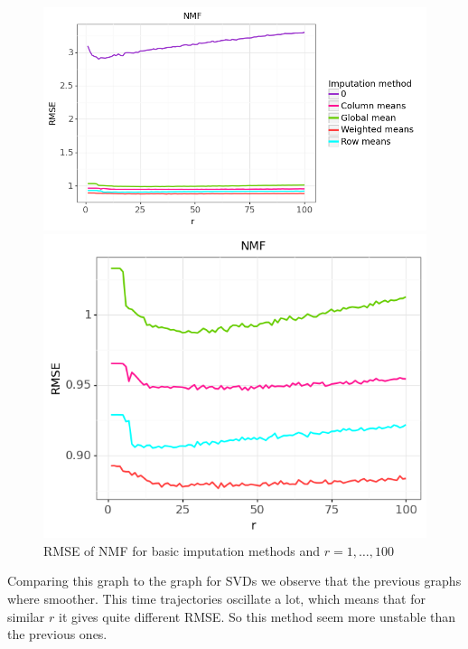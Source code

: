 \documentclass[11pt]{amsart}
\begin{document}
\begin{figure}[H]
\centering
\begin{minipage}{.63\textwidth}
  \centering
  \includegraphics[width=\textwidth]{nmf_1}
\end{minipage}%
\begin{minipage}{.4\textwidth}
  \centering
  \includegraphics[width=\textwidth]{nmf_2}
\end{minipage}
\caption{RMSE of NMF for basic imputation methods and $r = 1, \dots, 100$}
\end{figure}

Comparing this graph to the graph for SVDs we observe that the previous graphs where smoother.
This time trajectories oscillate a lot, which means that for similar $r$ it gives quite different RMSE.
So this method seem more unstable than the previous ones.
\end{document}
